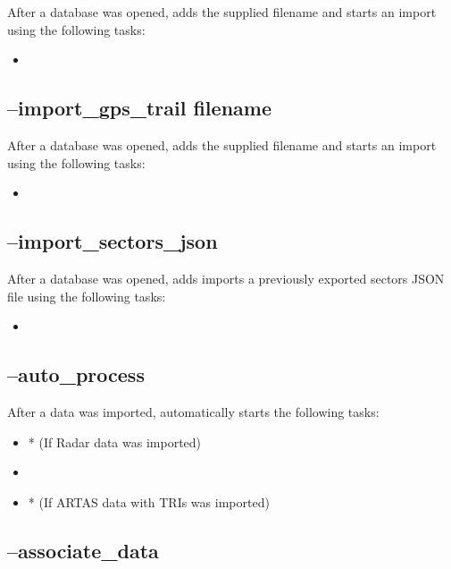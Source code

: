 After a database was opened, adds the supplied filename and starts an import using the following tasks:

\begin{itemize}
 \item {}
\end{itemize}

\subsection{--import\_gps\_trail filename}

After a database was opened, adds the supplied filename and starts an import using the following tasks:

\begin{itemize}
 \item {}
\end{itemize}

\subsection{--import\_sectors\_json}

After a database was opened, adds imports a previously exported sectors JSON file using the following tasks:

\begin{itemize}
 \item {}
\end{itemize}


\subsection{--auto\_process}

After a data was imported, automatically starts the following tasks:

\begin{itemize}
 \item {}* (If Radar data was imported)
 \item {}
 \item {}* (If ARTAS data with TRIs was imported)
\end{itemize}

\subsection{--associate\_data}


